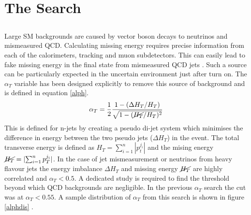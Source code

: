 
\chapter{The \alphat Search} %

\label{Chapter3} %



\section{\boldsymbol{\alphat}}
Large SM backgrounds are caused by vector boson decays to neutrinos and mismeasured QCD. Calculating missing energy requires precise information from each of the calorimeters, tracking and muon subdetectors. This can easily lead to fake missing energy in the final state from mismeasured QCD jets \cite{randall}. Such a source can be particularly expected in the uncertain environment just after turn on.  The $\alpha_T$ variable has been designed explicitly to remove this source of background and is defined in equation \ref{alph}.
\begin{equation}
\label{alph}
\alpha_T=\frac{1}{2}\frac{1-(\Delta H_T/H_T)}{\sqrt{1-(\cancel{H_T}/H_T)^2}}
\end{equation}
This is defined for n-jets by creating a pseudo di-jet system which minimises the difference in energy between the two pseudo jets ($\Delta H_T$) in the event. The total transverse energy is defined as $H_T=\sum_{i=1}^n|p_t^{j_i}|$ and the mising energy $\cancel{H_T}=|{\sum_{i=1}^n p_T^{j_i}}|$. In the case of jet mismeasurement or neutrinos from heavy flavour jets the energy imbalance $\Delta H_T$ and missing energy $\cancel{H_T}$ are highly correlated and $\alpha_T<0.5$. A dedicated study is required to find the threshold beyond which QCD backgrounds are negligible. In the previous $\alpha_T$ search the cut was at $\alpha_T<0.55$. A sample distribution of $\alpha_T$ from this search is shown in figure \ref{alphdis} \cite{CMSAT8}.
